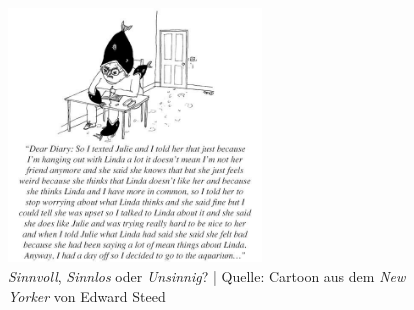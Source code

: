 \documentclass[emulatestandardclasses]{scrartcl}
\begin{document}
\begin{figure}[h]
	\centering
	\includegraphics[width=0.6\textwidth]{images/tractatus/newyorker}
	\caption{\emph{Sinnvoll}, \emph{Sinnlos} oder \emph{Unsinnig}? | Quelle: Cartoon aus dem \emph{New Yorker} von Edward Steed}
	\label{fig:newyorker}
\end{figure}


%
%
%


\end{document}
